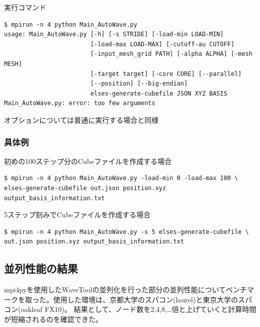 \documentclass{jsarticle}
\begin{document}
実行コマンド
\begin{Verbatim}[frame=single]
$ mpirun -n 4 python Main_AutoWave.py
usage: Main_AutoWave.py [-h] [-s STRIDE] [-load-min LOAD-MIN]
                        [-load-max LOAD-MAX] [-cutoff-au CUTOFF]
                        [-input_mesh_grid PATH] [-alpha ALPHA] [-mesh MESH]
                        [-target target] [-core CORE] [--parallel]
                        [--position] [--big-endian]
                        elses-generate-cubefile JSON XYZ BASIS
Main_AutoWave.py: error: too few arguments
\end{Verbatim}
オプションについては普通に実行する場合と同様

\subsubsection{具体例}
初めの100ステップ分のCubeファイルを作成する場合
\begin{Verbatim}[frame=single]
$ mpirun -n 4 python Main_AutoWave.py -load-min 0 -load-max 100 \
elses-generate-cubefile out.json position.xyz output_basis_information.txt
\end{Verbatim}
5ステップ刻みでCubeファイルを作成する場合
\begin{Verbatim}[frame=single]
$ mpirun -n 4 python Main_AutoWave.py -s 5 elses-generate-cubefile \
out.json position.xyz output_basis_information.txt
\end{Verbatim}

\subsection{並列性能の結果}
mpi4pyを使用したWaveToolの並列化を行った部分の並列性能についてベンチマークを取った。使用した環境は、京都大学のスパコン(laurel)と東京大学のスパコン(oakleaf FX10)。
結果として、ノード数を2,4,8,…倍と上げていくと計算時間が短縮されるのを確認できた。
\end{document}
